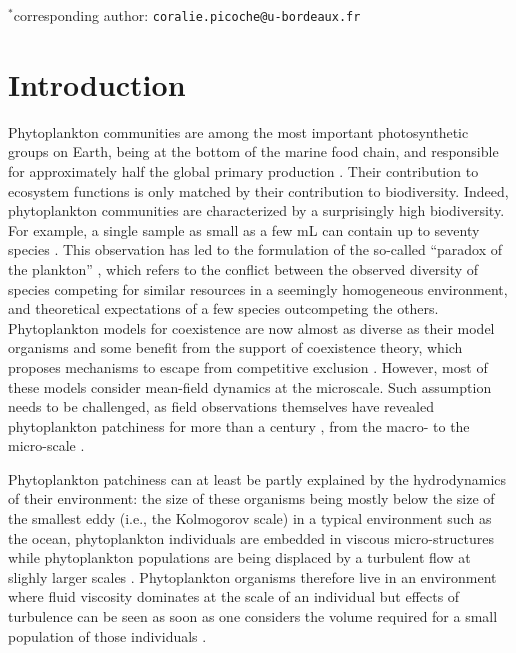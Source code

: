 \documentclass[english]{article}
\begin{document}
$^{*}$corresponding author: \verb|coralie.picoche@u-bordeaux.fr|

\doublespacing

\clearpage{}


\section*{Introduction}

Phytoplankton communities are among the most important photosynthetic
groups on Earth, being at the bottom of the marine food chain, and
responsible for approximately half the global primary production \citep{field_primary_1998}.
Their contribution to ecosystem functions is only matched by their
contribution to biodiversity. Indeed, phytoplankton communities are
characterized by a surprisingly high biodiversity. For example, a
single sample as small as a few mL can contain up to seventy species
\citep{REPHY_db,widdicombe_2021}. This observation has led to the
formulation of the so-called ``paradox of the plankton'' \citep{hutchinson_paradox_1961},
which refers to the conflict between the observed diversity of species
competing for similar resources in a seemingly homogeneous environment,
and theoretical expectations of a few species outcompeting the others.
Phytoplankton models for coexistence are now almost as diverse as
their model organisms \citep{record_paradox_2014} and some benefit
from the support of coexistence theory, which proposes mechanisms
to escape from competitive exclusion \citep{li_effects_2016,chesson_updates_2018}.
However, most of these models consider mean-field dynamics at the
microscale. Such assumption needs to be challenged, as field observations
themselves have revealed phytoplankton patchiness for more than a
century \citep{bainbridge_size_1957,stocker_marine_2012}, from the
macro- to the micro-scale \citep{leonard_interannual_2001,doubell_high-resolution_2006,font-munoz_advection_2017}.

Phytoplankton patchiness can at least be partly explained by the hydrodynamics
of their environment: the size of these organisms being mostly below
the size of the smallest eddy (i.e., the Kolmogorov scale) in a typical
environment such as the ocean, phytoplankton individuals are embedded
in viscous micro-structures \citep{peters_effects_2000} while phytoplankton
populations are being displaced by a turbulent flow at slighly larger
scales \citep{martin_phytoplankton_2003,prairie_biophysical_2012}.
Phytoplankton organisms therefore live in an environment where fluid
viscosity dominates at the scale of an individual but effects of turbulence
can be seen as soon as one considers the volume required for a small
population of those individuals \citep{estrada_effects_1987,prairie_biophysical_2012}
. 
\end{document}
